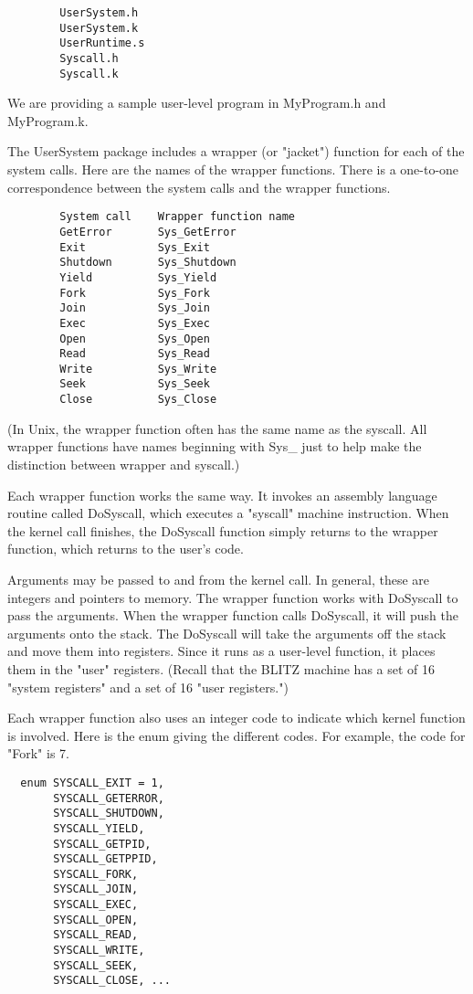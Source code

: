 \documentclass[12pt]{article}
\begin{document}
\begin{verbatim}
        UserSystem.h
        UserSystem.k
        UserRuntime.s
        Syscall.h
        Syscall.k
\end{verbatim}

We are providing a sample user-level program in MyProgram.h and MyProgram.k.

The UserSystem package includes a wrapper (or "jacket") function for
each of the system calls.  Here are the names of the wrapper
functions.  There is a one-to-one correspondence between the system
calls and the wrapper functions.

\begin{verbatim}
        System call    Wrapper function name
        GetError       Sys_GetError
        Exit           Sys_Exit
        Shutdown       Sys_Shutdown
        Yield          Sys_Yield
        Fork           Sys_Fork
        Join           Sys_Join
        Exec           Sys_Exec
        Open           Sys_Open
        Read           Sys_Read
        Write          Sys_Write
        Seek           Sys_Seek
        Close          Sys_Close
\end{verbatim}

(In Unix, the wrapper function often has the same name as the syscall.
All wrapper functions have names beginning with Sys\_ just to help make
the distinction between wrapper and syscall.)

Each wrapper function works the same way.  It invokes an assembly
language routine called DoSyscall, which executes a "syscall" machine
instruction.  When the kernel call finishes, the DoSyscall function
simply returns to the wrapper function, which returns to the user's
code.

Arguments may be passed to and from the kernel call.  In general,
these are integers and pointers to memory.  The wrapper function works
with DoSyscall to pass the arguments.  When the wrapper function calls
DoSyscall, it will push the arguments onto the stack.  The DoSyscall
will take the arguments off the stack and move them into registers.
Since it runs as a user-level function, it places them in the "user"
registers.  (Recall that the BLITZ machine has a set of 16 "system
registers" and a set of 16 "user registers.")

Each wrapper function also uses an integer code to indicate which
kernel function is involved.  Here is the enum giving the different
codes.  For example, the code for "Fork" is 7.

\begin{verbatim}
  enum SYSCALL_EXIT = 1,
       SYSCALL_GETERROR,
       SYSCALL_SHUTDOWN,
       SYSCALL_YIELD,
       SYSCALL_GETPID,
       SYSCALL_GETPPID,
       SYSCALL_FORK,
       SYSCALL_JOIN,
       SYSCALL_EXEC,
       SYSCALL_OPEN,
       SYSCALL_READ,
       SYSCALL_WRITE,
       SYSCALL_SEEK,
       SYSCALL_CLOSE, ...
\end{verbatim}
\end{document}
